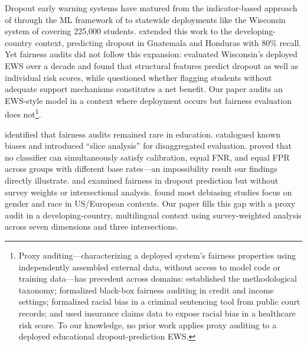 \documentclass[notitlepage,12pt]{jedm}
\begin{document}
Dropout early warning systems have matured from the indicator-based approach of  through the ML framework of  to statewide deployments like the Wisconsin system of  covering 225,000 students.  extended this work to the developing-country context, predicting dropout in Guatemala and Honduras with 80\% recall. Yet fairness audits did not follow this expansion:  evaluated Wisconsin's deployed EWS over a decade and found that structural features predict dropout as well as individual risk scores, while  questioned whether flagging students without adequate support mechanisms constitutes a net benefit. Our paper audits an EWS-style model in a context where deployment occurs but fairness evaluation does not\footnote{Proxy auditing---characterizing a deployed system's fairness properties using independently assembled external data, without access to model code or training data---has precedent across domains:  established the methodological taxonomy;  formalized black-box fairness auditing in credit and income settings;  formalized racial bias in a criminal sentencing tool from public court records; and  used insurance claims data to expose racial bias in a healthcare risk score. To our knowledge, no prior work applies proxy auditing to a deployed educational dropout-prediction EWS.}.

 identified that fairness audits remained rare in education.  catalogued known biases and introduced ``slice analysis'' for disaggregated evaluation.  proved that no classifier can simultaneously satisfy calibration, equal FNR, and equal FPR across groups with different base rates---an impossibility result our findings directly illustrate.  and  examined fairness in dropout prediction but without survey weights or intersectional analysis.  found most debiasing studies focus on gender and race in US/European contexts. Our paper fills this gap with a proxy audit in a developing-country, multilingual context using survey-weighted analysis across seven dimensions and three intersections.
\end{document}
